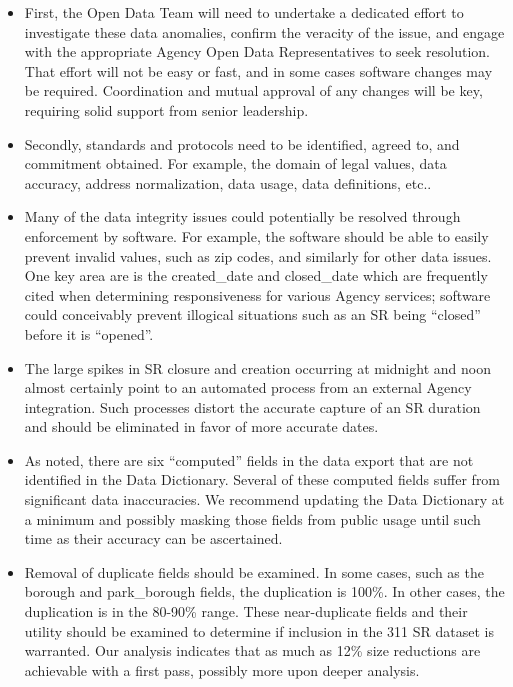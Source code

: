 \documentclass[linenumber]{jdsart}
\begin{document}
\begin{itemize}
	\item First, the Open Data Team will need 
	to undertake a dedicated effort to investigate these 
	data anomalies, confirm the veracity of the issue, 
	and engage with the appropriate Agency Open Data 
	Representatives to seek resolution. That effort will not 
	be easy or fast, and in some cases software changes may  
	be required. Coordination and mutual approval of any 
	changes will be key, requiring solid support 
	from senior leadership.

	\item Secondly, standards and protocols need to be 
	identified, agreed to, and commitment obtained. For example, 
	the domain of legal values, data accuracy, address normalization, 
	data usage, data definitions, etc..

	\item Many of the data integrity issues could potentially be 
	resolved through enforcement by software. For example, the 
	software should be able to easily prevent invalid values, such as zip 
	codes, and similarly for other data issues. One key area are is the 
	created\_date and closed\_date which are frequently cited 
	when determining responsiveness for various Agency services; software
	could conceivably prevent illogical situations such as an SR being
	``closed'' before it is ``opened''.
	
	\item The large spikes in SR closure and creation occurring at 
	midnight and noon almost certainly point to an automated 
	process from an external Agency integration. Such processes distort 
	the accurate capture of an SR duration and should be eliminated in
	favor of more accurate dates.
	
	\item As noted, there are six ``computed'' fields in the data export 
	that are not identified in the Data Dictionary. Several of 
	these computed fields suffer from significant data inaccuracies. We  
	recommend updating the Data Dictionary at a minimum and 
	possibly masking those fields from public usage until such time as 
	their accuracy can be ascertained.
	
	\item Removal of duplicate fields should be examined. In some cases, such 
	as the borough and park\_borough fields, the duplication is 100\%. In 
	other cases, the duplication is in the 80-90\% range. These near-duplicate 
	fields and 	their utility should be examined to determine if inclusion in the 
	311 SR dataset is warranted. Our analysis indicates that as much as 12\% 
	size reductions are achievable with a first pass, possibly more upon deeper
	analysis.
	

\end{itemize}
\end{document}
